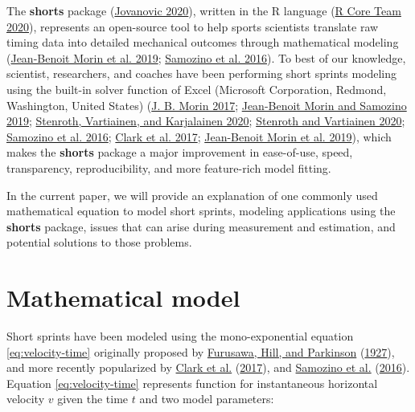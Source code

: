 \documentclass[fleqn,10pt,lineno]{wlpeerj} %
\begin{document}
The \textbf{shorts} package (\protect\hyperlink{ref-R-shorts}{Jovanovic 2020}), written in the R language (\protect\hyperlink{ref-R-base}{R Core Team 2020}), represents an open-source tool to help sports scientists translate raw timing data into detailed mechanical outcomes through mathematical modeling (\protect\hyperlink{ref-morinSimpleMethodComputing2019}{Jean-Benoit Morin et al. 2019}; \protect\hyperlink{ref-samozinoSimpleMethodMeasuring2016}{Samozino et al. 2016}). To best of our knowledge, scientist, researchers, and coaches have been performing short sprints modeling using the built-in solver function of Excel (Microsoft Corporation, Redmond, Washington, United States) (\protect\hyperlink{ref-morinSpreadsheetSprintAcceleration2017}{J. B. Morin 2017}; \protect\hyperlink{ref-morinSpreadsheetSprintAcceleration2019}{Jean-Benoit Morin and Samozino 2019}; \protect\hyperlink{ref-stenrothForcevelocityProfilingIce2020}{Stenroth, Vartiainen, and Karjalainen 2020}; \protect\hyperlink{ref-stenrothSpreadsheetSprintAcceleration2020}{Stenroth and Vartiainen 2020}; \protect\hyperlink{ref-samozinoSimpleMethodMeasuring2016}{Samozino et al. 2016}; \protect\hyperlink{ref-clarkNFLCombine40Yard2017}{Clark et al. 2017}; \protect\hyperlink{ref-morinSimpleMethodComputing2019}{Jean-Benoit Morin et al. 2019}), which makes the \textbf{shorts} package a major improvement in ease-of-use, speed, transparency, reproducibility, and more feature-rich model fitting.

In the current paper, we will provide an explanation of one commonly used mathematical equation to model short sprints, modeling applications using the \textbf{shorts} package, issues that can arise during measurement and estimation, and potential solutions to those problems.

\hypertarget{mathematical-model}{%
\section{Mathematical model}\label{mathematical-model}}

Short sprints have been modeled using the mono-exponential equation \eqref{eq:velocity-time} originally proposed by \protect\hyperlink{ref-doi:10.1098ux2frspb.1927.0035}{Furusawa, Hill, and Parkinson} (\protect\hyperlink{ref-doi:10.1098ux2frspb.1927.0035}{1927}), and more recently popularized by \protect\hyperlink{ref-clarkNFLCombine40Yard2017}{Clark et al.} (\protect\hyperlink{ref-clarkNFLCombine40Yard2017}{2017}), and \protect\hyperlink{ref-samozinoSimpleMethodMeasuring2016}{Samozino et al.} (\protect\hyperlink{ref-samozinoSimpleMethodMeasuring2016}{2016}). Equation \eqref{eq:velocity-time} represents function for instantaneous horizontal velocity \(v\) given the time \(t\) and two model parameters:
\end{document}
